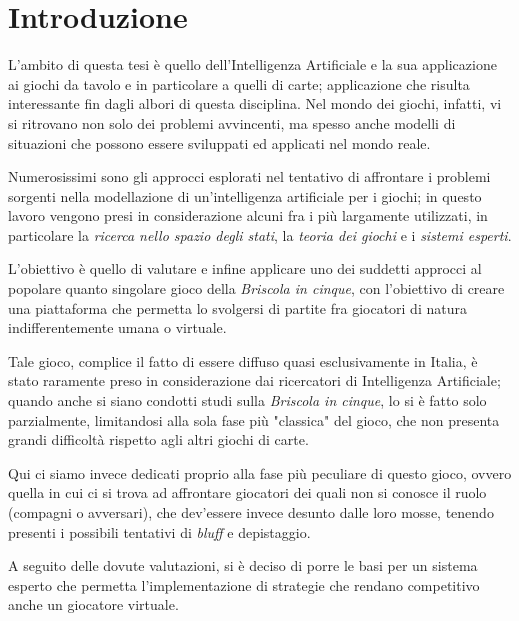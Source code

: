 \chapter*{Introduzione}

\ifpdf
    \graphicspath{{Introduction/IntroductionFigs/PNG/}{Introduction/IntroductionFigs/PDF/}{Introduction/IntroductionFigs/}}
\else
    \graphicspath{{Introduction/IntroductionFigs/EPS/}{Introduction/IntroductionFigs/}}
\fi

L'ambito di questa tesi è quello dell'Intelligenza Artificiale e la sua applicazione ai giochi da tavolo e in particolare a quelli di carte; applicazione che risulta interessante fin dagli albori di questa disciplina.
Nel mondo dei giochi, infatti, vi si ritrovano non solo dei problemi avvincenti, ma spesso anche modelli di situazioni che possono essere sviluppati ed applicati nel mondo reale.


Numerosissimi sono gli approcci esplorati nel tentativo di affrontare i problemi sorgenti nella modellazione di un'intelligenza artificiale per i giochi; in questo lavoro vengono presi in considerazione alcuni fra i più largamente utilizzati, in particolare la \emph{ricerca nello spazio degli stati}, la \emph{teoria dei giochi} e i \emph{sistemi esperti}.

L'obiettivo è quello di valutare e infine applicare uno dei suddetti approcci al popolare quanto singolare gioco della \emph{Briscola in cinque}, con l'obiettivo di creare una piattaforma che permetta lo svolgersi di partite fra giocatori di natura indifferentemente umana o virtuale.

Tale gioco, complice il fatto di essere diffuso quasi esclusivamente in Italia, è stato raramente preso in considerazione dai ricercatori di Intelligenza Artificiale; quando anche si siano condotti studi sulla \emph{Briscola in cinque}, lo si è fatto solo parzialmente, limitandosi alla sola fase più "classica" del gioco, che non presenta grandi difficoltà rispetto agli altri giochi di carte.

Qui ci siamo invece dedicati proprio alla fase più peculiare di questo gioco, ovvero quella in cui ci si trova ad affrontare giocatori dei quali non si conosce il ruolo (compagni o avversari), che dev'essere invece desunto dalle loro mosse, tenendo presenti i possibili tentativi di \emph{bluff} e depistaggio.

A seguito delle dovute valutazioni, si è deciso di porre le basi per un sistema esperto che permetta l'implementazione di strategie che rendano competitivo anche un giocatore virtuale.





